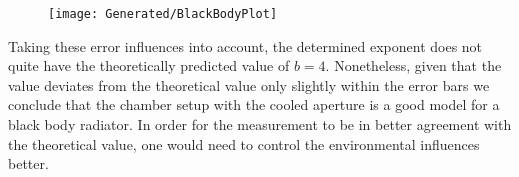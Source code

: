 \documentclass[a4paper,10pt,twocolumn]{article}
\begin{document}
    \begin{figure}
        \begin{center}
            \texttt{[image: Generated/BlackBodyPlot]}
            \caption{}
            \label{fig:BlackBodyPlot}
        \end{center}
    \end{figure}
    Taking these error influences into account, the determined exponent does not quite have the theoretically predicted value of $b = 4 $.
    Nonetheless, given that the value deviates from the theoretical value only slightly within the error bars we conclude that the chamber setup with the cooled aperture
    is a good model for a black body radiator.
    In order for the measurement to be in better agreement with the theoretical value, one would need to control the environmental influences better. 
    
    
    
    
\end{document}
